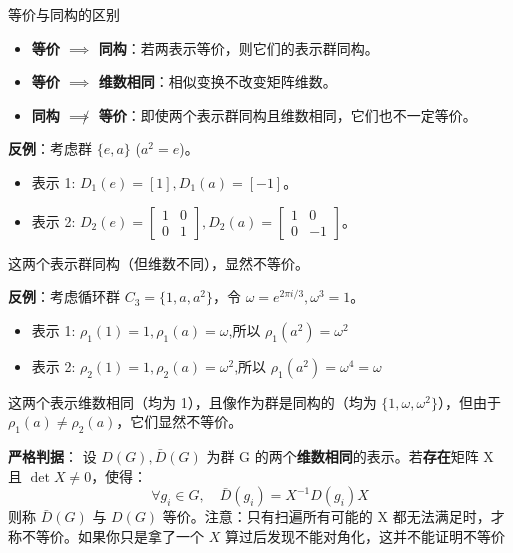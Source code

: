 \begin{note}{等价与同构的区别}
    \begin{itemize}
        \item \textbf{等价 $\implies$ 同构}：若两表示等价，则它们的表示群同构。
        \item \textbf{等价 $\implies$ 维数相同}：相似变换不改变矩阵维数。
        \item \textbf{同构 $\not\implies$ 等价}：即使两个表示群同构且维数相同，它们也不一定等价。
    \end{itemize}

    \textbf{反例}：考虑群 $\{e, a\}$ ($a^2=e$)。
    \begin{itemize}
        \item 表示 1: $D_1(e) = [1], D_1(a) = [-1]$。
        \item 表示 2: $D_2(e) = \begin{bmatrix} 1 & 0 \\ 0 & 1 \end{bmatrix}, D_2(a) = \begin{bmatrix} 1 & 0 \\ 0 & -1 \end{bmatrix}$。
    \end{itemize}
    这两个表示群同构（但维数不同），显然不等价。

    \textbf{反例}：考虑循环群 $C_3 = \{1, a, a^2\}$，令 $\omega = e^{2\pi i / 3},\omega^{3}=1$。
    \begin{itemize}
        \item 表示 1: $\rho_1(1) = 1, \rho_1(a) = \omega$,所以 $\rho_1(a^{2}) = \omega^{2}$
        \item 表示 2: $\rho_2(1) = 1, \rho_2(a) = \omega^2$,所以 $\rho_1(a^{2}) = \omega^{4}=\omega$
    \end{itemize}
    这两个表示维数相同（均为 1），且像作为群是同构的（均为 $\{1, \omega, \omega^2\}$），但由于 $\rho_1(a) \neq \rho_2(a)$，它们显然不等价。
    
    \textbf{严格判据}：
    设 $D(G), \bar{D}(G)$ 为群 G 的两个\textbf{维数相同}的表示。若\textbf{存在}矩阵 X 且 $\det X \neq 0$，使得：
    \begin{equation}
        \forall g_i \in G, \quad \bar{D}(g_i) = X^{-1} D(g_i) X
    \end{equation}
    则称 $\bar{D}(G)$ 与 $D(G)$ 等价。注意：只有扫遍所有可能的 X 都无法满足时，才称不等价。如果你只是拿了一个 $X$ 算过后发现不能对角化，这并不能证明不等价
\end{note}

